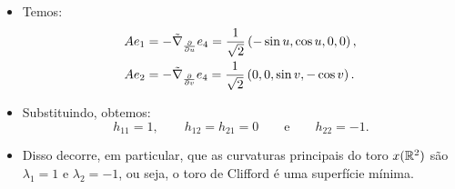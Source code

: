 \documentclass[12pt,a4paper]{beamer}
\theoremstyle{definition}
\begin{document}
\begin{frame}

	\begin{itemize}
		
		\item Temos:
		\begin{align*}
		A e_1 &= -\tilde{\nabla}_{\frac{\partial}{\partial u}} e_4 = \frac{1}{\sqrt{2}} \left( -\sin u, \cos u, 0, 0 \right),\\
		A e_2 &= -\tilde{\nabla}_{\frac{\partial}{\partial v}} e_4 = \frac{1}{\sqrt{2}} \left( 0,0, \sin v, -\cos v \right).
		\end{align*}
		
		\pause
		
		\item Substituindo, obtemos:
		\[ h_{11} = 1, \qquad h_{12}=h_{21}=0 \qquad \text{e} \qquad h_{22} = -1. \]
		
		\pause
		
		\item Disso decorre, em particular, que as curvaturas principais do toro $x(\mathbb R^2)$ são $\lambda_1 = 1$ e $\lambda_2 = -1$, ou seja, \alert{o toro de Clifford é uma superfície mínima}.
	\end{itemize}
	

\end{frame}
\end{document}
